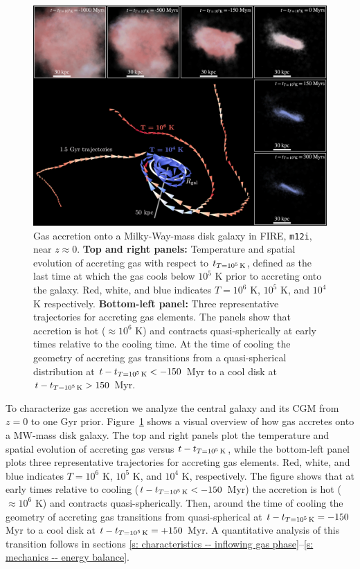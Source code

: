 \documentclass[fleqn,usenatbib]{mnras}
\newcommand{\tcon}{t_{T=10^5\,{\rm K}}}
\begin{document}
\begin{figure}
    \centering
    \includegraphics[width=\textwidth]{figures/illustrative_tracks/illustrative_tracks.png}
    \caption{
Gas accretion onto a Milky-Way-mass disk galaxy in FIRE, \texttt{m12i}, near $z\approx0$.
\textbf{Top and right panels:}
Temperature and spatial evolution of accreting gas with respect to $\tcon$, defined as the last time at which the gas cools below $10^5$ K prior to accreting onto the galaxy. 
Red, white, and blue indicates $T=10^6$ K, $10^5$ K, and $10^4$ K respectively. 
\textbf{Bottom-left panel:}
Three representative trajectories for accreting gas elements.
The panels show that accretion is hot ($\approx 10^6$ K) and contracts quasi-spherically at early times relative to the cooling time. At the time of cooling the geometry of accreting gas transitions from a quasi-spherical distribution at $t-\tcon < -150$ Myr to a cool disk at $t-\tcon > 150$ Myr.
    }
    \label{f: overview}
\end{figure}

To characterize gas accretion we analyze the central galaxy and its CGM from $z=0$ to one Gyr prior.
Figure~\ref{f: overview} shows a visual overview of how gas accretes onto a MW-mass disk galaxy. 
The top and right panels plot the temperature and spatial evolution of accreting gas versus $t-\tcon$, while the bottom-left panel plots three representative trajectories for accreting gas elements. 
Red, white, and blue indicates $T=10^6$ K, $10^5$ K, and $10^4$ K, respectively. The figure shows that at early times relative to cooling ($t-\tcon<-150$ Myr) the accretion is hot ($\approx10^6$ K) and contracts quasi-spherically. Then, around the time of cooling the geometry of accreting gas transitions from quasi-spherical at $t - \tcon=-150$ Myr to a cool disk at $t - \tcon=+ 150$ Myr. A quantitative analysis of this transition follows in sections \ref{s: characteristics -- inflowing gas phase}--\ref{s: mechanics -- energy balance}.
\end{document}
